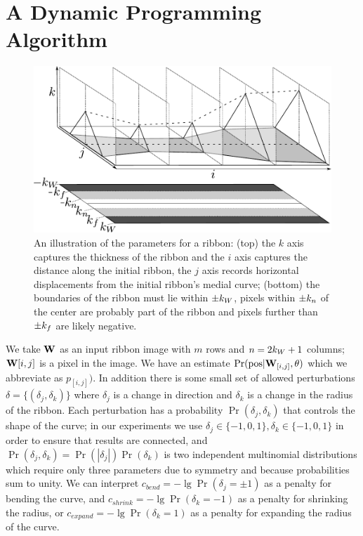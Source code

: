 \section{A Dynamic Programming Algorithm}

\begin{figure}[htb]
    \centering
    \includegraphics[width=0.95\columnwidth]{Figures/ribbon-3d-combined.pdf}
    \caption[3D Ribbon Image 2]{An illustration of the parameters for a ribbon: (top) the $k$ axis captures the thickness of the ribbon and the $i$ axis captures the distance along the initial ribbon, the $j$ axis records horizontal displacements from the initial ribbon's medial curve; (bottom) the boundaries of the ribbon must lie within $\pm k_W{}$, pixels within $\pm k_n{}$ of the center are probably part of the ribbon and pixels further than $\pm k_f{}$ are likely negative. }
    \label{fig:ribbon_3d_2}
\end{figure}

We take $\mathbf{W}{}$ as an input ribbon image with $m$ rows and $n=2k_W+1$ columns; $\mathbf{W}{}{[i,j]}$ is a pixel in the image. We have an estimate $\Pr(\text{pos}|\mathbf{W}{}_{[i,j]}, \theta)$ which we abbreviate as $p_{[i,j]})$. In addition there is some small set of allowed perturbations $\delta=\{(\delta_j, \delta_k)\}$ where $\delta_j$ is a change in direction and $\delta_k$ is a change in the radius of the ribbon. Each perturbation has a probability $\Pr(\delta_j, \delta_k)$ that controls the shape of the curve; in our experiments we use $\delta_j\in\{-1,0,1\}, \delta_k\in\{-1, 0,1\}$ in order to ensure that results are connected, and  $\Pr(\delta_j, \delta_k)=\Pr(|\delta_j|)\Pr(\delta_k)$ is two independent multinomial distributions which require only three parameters due to symmetry and because probabilities sum to unity. We can interpret $c_\mathit{bend}=-\lg \Pr(\delta_j=\pm1)$ as a penalty for bending the curve, and $c_\mathit{shrink}=-\lg \Pr(\delta_k=-1)$ as a penalty for shrinking the radius, or $c_\mathit{expand} = -\lg \Pr(\delta_k=1)$ as a penalty for expanding the radius of the curve. 

